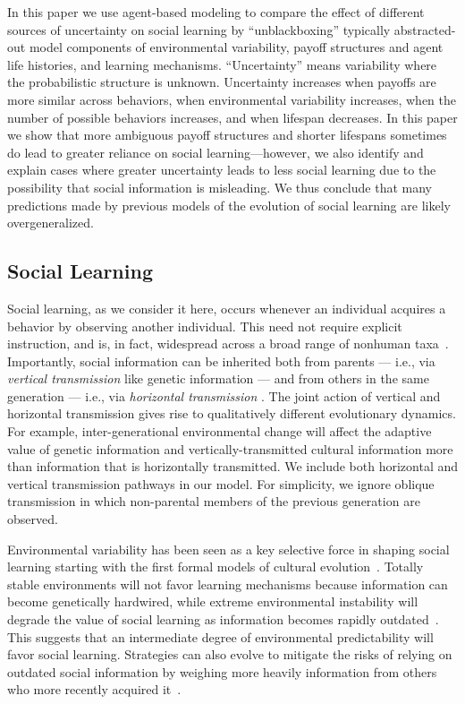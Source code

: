\documentclass[letterpaper,11.5pt]{scrartcl}
\begin{document}
In this paper we use agent-based modeling to compare the effect of
different sources of uncertainty on social learning
by ``unblackboxing'' typically abstracted-out model components 
of environmental variability, payoff structures and
agent life histories, and  learning mechanisms. ``Uncertainty''  
means variability where the probabilistic structure is unknown. %
Uncertainty increases when payoffs are more similar across behaviors, when
environmental variability increases, when the number of possible behaviors
increases, and when lifespan decreases.  In this paper we show that more ambiguous
payoff structures and shorter lifespans sometimes do lead to greater reliance on
social learning---however, we also identify and explain cases where greater
uncertainty leads to less social learning due to the possibility that social
information is misleading.  We thus conclude that many predictions made by previous
models of the evolution of social learning are likely overgeneralized.

\subsection{Social Learning}

Social learning, as we consider it here, occurs whenever an individual acquires a behavior by observing another individual. This need not require explicit instruction, and is, in fact, widespread across a broad range of nonhuman 
taxa~\cite{Kendal2018,Allen2019}. Importantly, social information can be inherited both
from parents --- i.e., via \emph{vertical transmission} like genetic information --- and
from others in the same generation --- i.e., via \emph{horizontal transmission}
\cite{CavalliFeldman1981}. The joint action of vertical and horizontal transmission
gives rise to qualitatively different evolutionary dynamics. For example,
inter-generational environmental change will affect the adaptive value of genetic
information and vertically-transmitted cultural information more than information
that is horizontally transmitted. We include both horizontal and vertical transmission pathways in our
model. For simplicity, we ignore oblique transmission in which non-parental members
of the previous generation are observed.

Environmental variability has been seen as a key selective force in shaping social learning starting with the first formal models of cultural evolution~\cite{CavalliFeldman1981,BoydRicherson1985}.
Totally stable environments will not favor learning mechanisms because information can become genetically hardwired, while  extreme environmental instability will degrade the value
of social learning as information becomes rapidly outdated~\cite{Feldman1996}. This suggests that an intermediate degree of environmental predictability will favor social learning. Strategies can also evolve to mitigate the risks of relying on outdated social information by weighing more heavily information from others who more recently acquired it~\cite{Rendell2010}.
\end{document}
